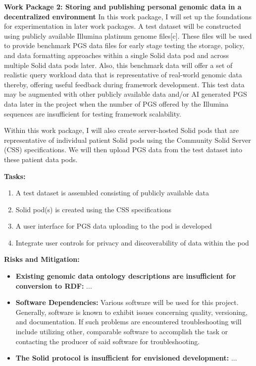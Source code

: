 \documentclass{article}
\begin{document}
\textbf{Work Package 2: Storing and publishing personal genomic data in a decentralized environment} 
In this work package, I will set up the foundations for experimentation in later work packages. A test dataset will be constructed using publicly available Illumina platinum genome files[c]. These files will be used to provide benchmark PGS data files for early stage testing the storage, policy, and data formatting approaches within a single Solid data pod and across multiple Solid data pods later. Also, this benchmark data will offer a set of realistic query workload data that is representative of real-world genomic data thereby, offering useful feedback during framework development. This test data may be augmented with other publicly available data and/or AI generated PGS data later in the project when the number of PGS offered by the Illumina sequences are insufficient for testing framework scalability.

Within this work package, I will also create server-hosted Solid pods that are representative of individual patient Solid pods using the Community Solid Server (CSS) specifications. We will then upload PGS data from the test dataset into these patient data pods. 

\textbf{Tasks:}  
\begin{enumerate}
	\item A test dataset is assembled consisting of publicly available data
	\item Solid pod(s) is created using the CSS specifications
	\item A user interface for PGS data uploading to the pod is developed
	\item Integrate user controls for privacy and discoverability of data within the pod
\end{enumerate}

\textbf{Risks and Mitigation:} 
\begin{itemize}
	\item \textbf{Existing genomic data ontology descriptions are insufficient for conversion to RDF:} ...
	\item \textbf{Software Dependencies:} Various software will be used for this project. Generally, software is known to exhibit issues concerning quality, versioning, and documentation. If such problems are encountered troubleshooting will include utilizing other, comparable software to accomplish the task or contacting the producer of said software for troubleshooting.
	\item \textbf{The Solid protocol is insufficient for envisioned development:} ...
\end{itemize}
\end{document}
